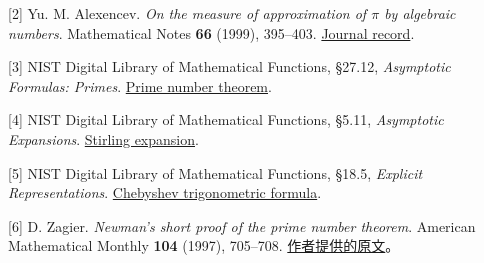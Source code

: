 \documentclass[11pt,a4paper]{article}
\begin{document}
{[}2{]} Yu. M. Alexencev. \emph{On the measure of approximation of \(\pi\) by algebraic numbers}. Mathematical Notes \textbf{66} (1999), 395--403. \href{https://www.mathnet.ru/eng/mzm1191}{Journal record}.

{[}3{]} NIST Digital Library of Mathematical Functions, §27.12, \emph{Asymptotic Formulas: Primes}. \href{https://dlmf.nist.gov/27.12}{Prime number theorem}.

{[}4{]} NIST Digital Library of Mathematical Functions, §5.11, \emph{Asymptotic Expansions}. \href{https://dlmf.nist.gov/5.11.E1}{Stirling expansion}.

{[}5{]} NIST Digital Library of Mathematical Functions, §18.5, \emph{Explicit Representations}. \href{https://dlmf.nist.gov/18.5.E1}{Chebyshev trigonometric formula}.

{[}6{]} D. Zagier. \emph{Newman's short proof of the prime number theorem}. American Mathematical Monthly \textbf{104} (1997), 705--708. \href{https://people.mpim-bonn.mpg.de/zagier/files/doi/10.2307/2975232/fulltext.pdf}{作者提供的原文}。
\end{document}

